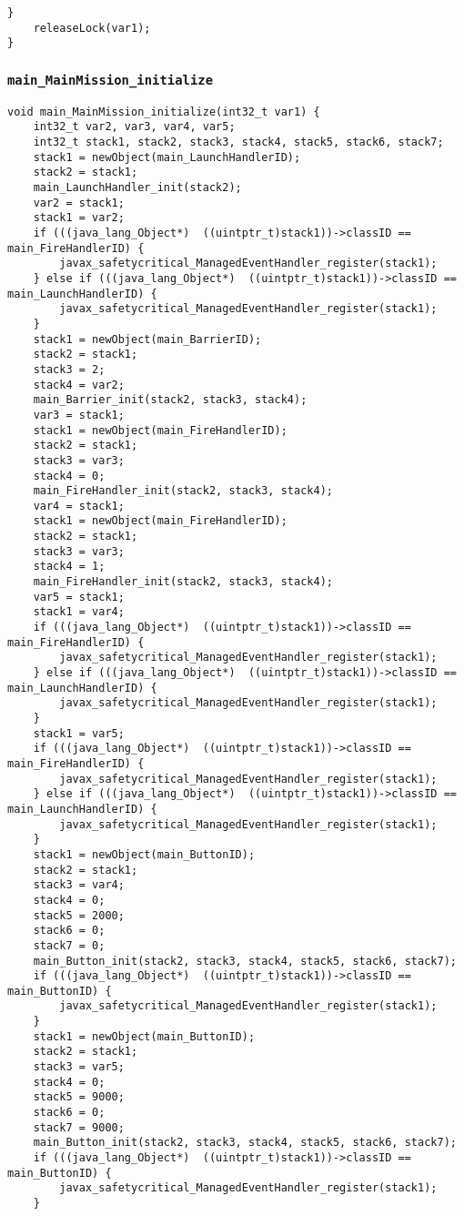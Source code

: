 \begin{landscape}
\begin{multicols}{2}
\begin{lstlisting}[firstnumber=2362]
	}
	releaseLock(var1);
}
\end{lstlisting}

\subsubsection{\texttt{main\_MainMission\_initialize}}

\begin{lstlisting}[firstnumber=2437]
void main_MainMission_initialize(int32_t var1) {
	int32_t var2, var3, var4, var5;
	int32_t stack1, stack2, stack3, stack4, stack5, stack6, stack7;
	stack1 = newObject(main_LaunchHandlerID);
	stack2 = stack1;
	main_LaunchHandler_init(stack2);
	var2 = stack1;
	stack1 = var2;
	if (((java_lang_Object*)  ((uintptr_t)stack1))->classID == main_FireHandlerID) {
		javax_safetycritical_ManagedEventHandler_register(stack1);
	} else if (((java_lang_Object*)  ((uintptr_t)stack1))->classID == main_LaunchHandlerID) {
		javax_safetycritical_ManagedEventHandler_register(stack1);
	}
	stack1 = newObject(main_BarrierID);
	stack2 = stack1;
	stack3 = 2;
	stack4 = var2;
	main_Barrier_init(stack2, stack3, stack4);
	var3 = stack1;
	stack1 = newObject(main_FireHandlerID);
	stack2 = stack1;
	stack3 = var3;
	stack4 = 0;
	main_FireHandler_init(stack2, stack3, stack4);
	var4 = stack1;
	stack1 = newObject(main_FireHandlerID);
	stack2 = stack1;
	stack3 = var3;
	stack4 = 1;
	main_FireHandler_init(stack2, stack3, stack4);
	var5 = stack1;
	stack1 = var4;
	if (((java_lang_Object*)  ((uintptr_t)stack1))->classID == main_FireHandlerID) {
		javax_safetycritical_ManagedEventHandler_register(stack1);
	} else if (((java_lang_Object*)  ((uintptr_t)stack1))->classID == main_LaunchHandlerID) {
		javax_safetycritical_ManagedEventHandler_register(stack1);
	}
	stack1 = var5;
	if (((java_lang_Object*)  ((uintptr_t)stack1))->classID == main_FireHandlerID) {
		javax_safetycritical_ManagedEventHandler_register(stack1);
	} else if (((java_lang_Object*)  ((uintptr_t)stack1))->classID == main_LaunchHandlerID) {
		javax_safetycritical_ManagedEventHandler_register(stack1);
	}
	stack1 = newObject(main_ButtonID);
	stack2 = stack1;
	stack3 = var4;
	stack4 = 0;
	stack5 = 2000;
	stack6 = 0;
	stack7 = 0;
	main_Button_init(stack2, stack3, stack4, stack5, stack6, stack7);
	if (((java_lang_Object*)  ((uintptr_t)stack1))->classID == main_ButtonID) {
		javax_safetycritical_ManagedEventHandler_register(stack1);
	}
	stack1 = newObject(main_ButtonID);
	stack2 = stack1;
	stack3 = var5;
	stack4 = 0;
	stack5 = 9000;
	stack6 = 0;
	stack7 = 9000;
	main_Button_init(stack2, stack3, stack4, stack5, stack6, stack7);
	if (((java_lang_Object*)  ((uintptr_t)stack1))->classID == main_ButtonID) {
		javax_safetycritical_ManagedEventHandler_register(stack1);
	}


\end{lstlisting}
\end{multicols}
\end{landscape}
